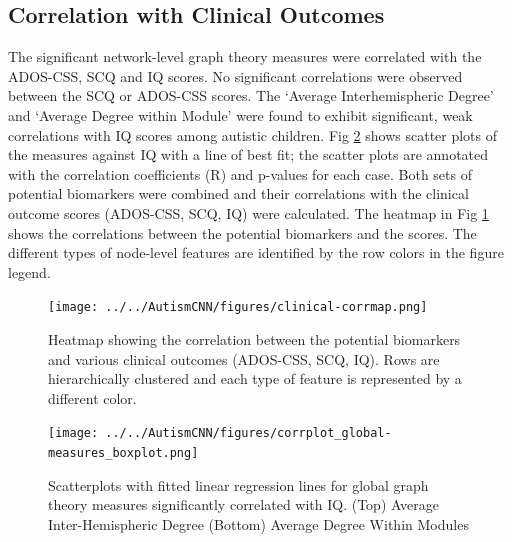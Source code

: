 \documentclass[11pt,conference]{IEEEtran}
\begin{document}
\subsection*{\textbf{Correlation with Clinical Outcomes}}

    The significant network-level graph theory measures were correlated with the ADOS-CSS, 
    SCQ and IQ scores. No significant correlations were observed between the SCQ or ADOS-CSS
    scores. The `Average Interhemispheric Degree' and `Average Degree within Module' were 
    found to exhibit significant, weak correlations with IQ scores among autistic children.
    Fig \ref{clinical-corrplots} shows scatter plots of the measures against IQ with a 
    line of best fit; the scatter plots are annotated with the correlation coefficients (R) 
    and p-values for each case.
    Both sets of potential biomarkers were combined and their correlations with the 
    clinical outcome scores (ADOS-CSS, SCQ, IQ) were calculated. The heatmap in Fig 
    \ref{clinical-corrmap} shows the correlations between the potential biomarkers and the 
    scores. The different types of node-level features are identified by the row colors in 
    the figure legend. 

    \begin{figure}
        \vskip 0.2in
        \begin{center}
            \centerline{\texttt{[image: ../../AutismCNN/figures/clinical-corrmap.png]}}
            \caption{
                Heatmap showing the correlation between the potential biomarkers and various 
                clinical outcomes (ADOS-CSS, SCQ, IQ). Rows are hierarchically clustered and 
                each type of feature is represented by a different color.
            }
            \label{clinical-corrmap}
        \end{center}
        \vskip -0.2in
    \end{figure}

    \begin{figure}
        \vskip 0.2in
        \begin{center}
            \centerline{\texttt{[image: ../../AutismCNN/figures/corrplot\_global-measures\_boxplot.png]}}
            \caption{
                Scatterplots with fitted linear regression lines for global graph theory 
                measures significantly correlated with IQ. (Top) Average Inter-Hemispheric 
                Degree  (Bottom) Average Degree Within Modules
            }
            \label{clinical-corrplots}
        \end{center}
        \vskip -0.2in
    \end{figure}
\end{document}
